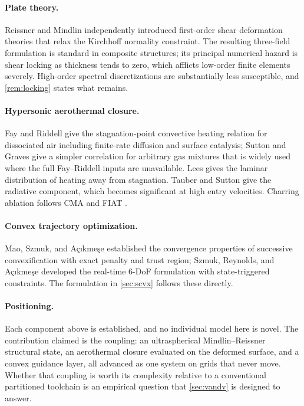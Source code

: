 \documentclass[11pt,a4paper]{article}
\theoremstyle{definition}
\numberwithin{equation}{section}
\begin{document}
\paragraph{Plate theory.} Reissner \cite{reissner1945} and Mindlin \cite{mindlin1951} independently introduced first-order shear deformation theories that relax the Kirchhoff normality constraint. The resulting three-field formulation is standard in composite structures; its principal numerical hazard is shear locking as thickness tends to zero, which afflicts low-order finite elements severely. High-order spectral discretizations are substantially less susceptible, and \cref{rem:locking} states what remains.

\paragraph{Hypersonic aerothermal closure.} Fay and Riddell \cite{fay1958} give the stagnation-point convective heating relation for dissociated air including finite-rate diffusion and surface catalysis; Sutton and Graves \cite{sutton1971} give a simpler correlation for arbitrary gas mixtures that is widely used where the full Fay--Riddell inputs are unavailable. Lees \cite{lees1956} gives the laminar distribution of heating away from stagnation. Tauber and Sutton \cite{tauber1991} give the radiative component, which becomes significant at high entry velocities. Charring ablation follows CMA \cite{moyer1968} and FIAT \cite{chen1999}.

\paragraph{Convex trajectory optimization.} Mao, Szmuk, and Açıkmeşe \cite{mao2016} established the convergence properties of successive convexification with exact penalty and trust region; Szmuk, Reynolds, and Açıkmeşe \cite{szmuk2020} developed the real-time 6-DoF formulation with state-triggered constraints. The formulation in \cref{sec:scvx} follows these directly.

\paragraph{Positioning.} Each component above is established, and no individual model here is novel. The contribution claimed is the coupling: an ultraspherical Mindlin--Reissner structural state, an aerothermal closure evaluated on the deformed surface, and a convex guidance layer, all advanced as one system on grids that never move. Whether that coupling is worth its complexity relative to a conventional partitioned toolchain is an empirical question that \cref{sec:vandv} is designed to answer.
\end{document}
